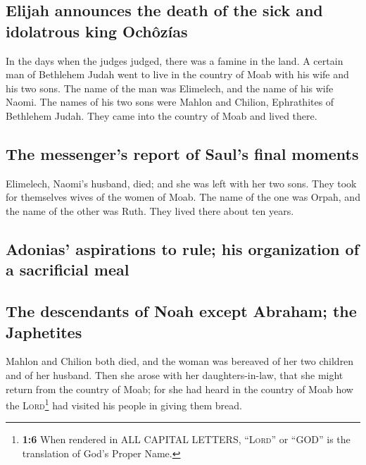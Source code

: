 \hypertarget{elijah-announces-the-death-of-the-sick-and-idolatrous-king-ochuxf4zuxedas}{%
\subsection{Elijah announces the death of the sick and idolatrous king
Ochôzías}\label{elijah-announces-the-death-of-the-sick-and-idolatrous-king-ochuxf4zuxedas}}

 In the days when the judges judged, there was a famine in
the land. A certain man of Bethlehem Judah went to live in the country
of Moab with his wife and his two sons.  The name of the
man was Elimelech, and the name of his wife Naomi. The names of his two
sons were Mahlon and Chilion, Ephrathites of Bethlehem Judah. They came
into the country of Moab and lived there.

\hypertarget{the-messengers-report-of-sauls-final-moments}{%
\subsection{The messenger's report of Saul's final
moments}\label{the-messengers-report-of-sauls-final-moments}}

 Elimelech, Naomi's husband, died; and she was left with
her two sons.  They took for themselves wives of the women
of Moab. The name of the one was Orpah, and the name of the other was
Ruth. They lived there about ten years.

\hypertarget{adonias-aspirations-to-rule-his-organization-of-a-sacrificial-meal}{%
\subsection{Adonias' aspirations to rule; his organization of a
sacrificial
meal}\label{adonias-aspirations-to-rule-his-organization-of-a-sacrificial-meal}}

\hypertarget{the-descendants-of-noah-except-abraham-the-japhetites}{%
\subsection{The descendants of Noah except Abraham; the
Japhetites}\label{the-descendants-of-noah-except-abraham-the-japhetites}}

 Mahlon and Chilion both died, and the woman was bereaved
of her two children and of her husband.  Then she arose
with her daughters-in-law, that she might return from the country of
Moab; for she had heard in the country of Moab how the
\textsc{Lord}\footnote{\textbf{1:6} When rendered in ALL CAPITAL
  LETTERS, ``\textsc{Lord}'' or ``GOD'' is the translation of God's
  Proper Name.} had visited his people in giving them bread.

